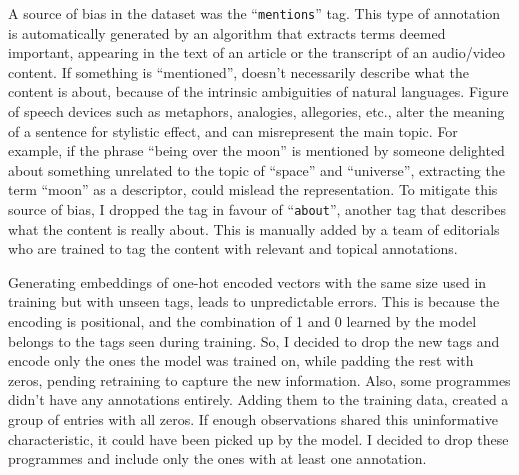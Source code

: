 A source of bias in the dataset was the ``\verb|mentions|'' tag. This type of annotation is automatically generated by an algorithm that extracts
terms deemed important, appearing in the text of an article or the transcript of an audio/video content.
If something is ``mentioned'', doesn't necessarily describe what the content is about, because of the intrinsic ambiguities of natural languages.
Figure of speech devices such as metaphors, analogies, allegories, etc., alter the meaning of a sentence for stylistic effect, and can
misrepresent the main topic. For example, if the phrase ``being over the moon'' is mentioned
by someone delighted about something unrelated to the topic of ``space'' and ``universe'',
extracting the term ``moon'' as a descriptor, could mislead the representation.
To mitigate this source of bias, I dropped the tag in favour of ``\verb|about|'', another tag that describes what the content is really about.
This is manually added by a team of editorials who are trained to tag the content with relevant and topical annotations.

Generating embeddings of one-hot encoded vectors with the same size used in training but with
unseen tags, leads to unpredictable errors. This is because the encoding is positional,
and the combination of 1 and 0 learned by the model
belongs to the tags seen during training. So, I decided to drop the new tags and encode only the ones the model was trained on,
while padding the rest with zeros, pending retraining to capture the new information.
Also, some programmes didn't have any annotations entirely. Adding them to the training data, created a group of entries with all zeros.
If enough observations shared this uninformative characteristic, it could have been picked up by the model.
I decided to drop these programmes and include only the ones with at least one annotation.
